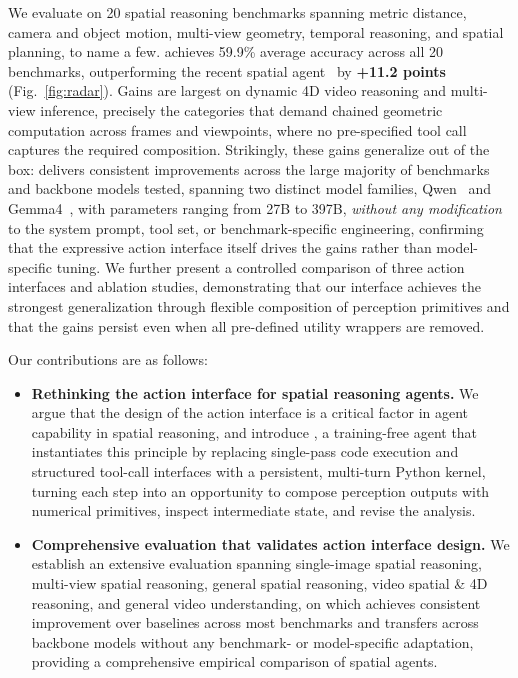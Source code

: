 We evaluate \ours{} on 20 spatial reasoning benchmarks spanning metric distance, camera and object motion, multi-view geometry, temporal reasoning, and spatial planning, to name a few.
\ours{} achieves 59.9\% average accuracy across all 20 benchmarks, outperforming the recent spatial agent~\citep{chen2025spacetools} by \textbf{+11.2 points} (Fig.~\ref{fig:radar}).
Gains are largest on dynamic 4D video reasoning and multi-view inference, precisely the categories that demand chained geometric computation across frames and viewpoints, where no pre-specified tool call captures the required composition.
Strikingly, these gains generalize out of the box: \ours{} delivers consistent improvements across the large majority of benchmarks and backbone models tested, spanning two distinct model families, Qwen~\citep{qwen3.5,qwen3.6-27b,qwen36_35b_a3b} and Gemma4~\citep{gemma4}, with parameters ranging from 27B to 397B, \emph{without any modification} to the system prompt, tool set, or benchmark-specific engineering, confirming that the expressive action interface itself drives the gains rather than model-specific tuning.
We further present a controlled comparison of three action interfaces and ablation studies, demonstrating that our interface achieves the strongest generalization through flexible composition of perception primitives and that the gains persist even when all pre-defined utility wrappers are removed.

Our contributions are as follows:
\begin{itemize}[leftmargin=1.5em,itemsep=1pt,topsep=1pt]
  \item \textbf{Rethinking the action interface for spatial reasoning agents.}
    We argue that the design of the action interface is a critical factor in agent capability in spatial reasoning, and introduce \ours{}, a training-free agent that instantiates this principle by replacing single-pass code execution and structured tool-call interfaces with a persistent, multi-turn Python kernel, turning each step into an opportunity to compose perception outputs with numerical primitives, inspect intermediate state, and revise the analysis.
  \item \textbf{Comprehensive evaluation that validates action interface design.}
    We establish an extensive evaluation spanning single-image spatial reasoning, multi-view spatial reasoning, general spatial reasoning, video spatial \& 4D reasoning, and general video understanding, on which \ours{} achieves consistent improvement over baselines across most benchmarks and transfers across backbone models without any benchmark- or model-specific adaptation, providing a comprehensive empirical comparison of spatial agents.
\end{itemize}